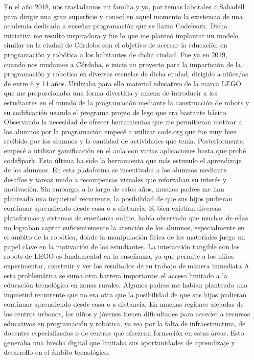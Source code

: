 
En el año 2018, nos trasladamos mi familia y yo, por temas laborales a Sabadell para dirigir una gran superficie y conocí en aquel momento la existencia de una academia dedicada a enseñar programación que se llama Codelearn. Dicha iniciativa me resulto inspiradora y fue lo que me planteó implantar un modelo similar en la ciudad de Córdoba con el objetivo de acercar la educación en programación y robótica a los habitantes de dicha ciudad.
Fue ya en 2019, cuando nos mudamos a Córdoba, e inicie un proyecto para la impartición de la programación y robotica en diversas escuelas de dicha ciudad, dirigido a niños/as de entre 6 y 14 años. Utilizaba para ello material educativo de la marca LEGO que me proporcionaba una forma divertida y amena de introducir a los estudiantes en el mundo de la programación mediante la construcción de robots y su codificación usando el programa propio de lego que era bastante básico.
Observando la necesidad de ofrecer herramientas que me permitieran motivar a los alumnos por la programación empecé a utilizar code.org que fue muy bien recibido por los alumnos y la cantidad de actividades que tenía. Posteriormente, empecé a utilizar gamificación en el aula con varias aplicaciones hasta que probé codeSpark. Esta última ha sido la herramienta que más estimulo el aprendizaje de los alumnos. En esta plataforma se incentivaba a los alumnos mediante desafíos y tareas unido a recompensas visuales que reforzaban su interés y motivación.
Sin embargo, a lo largo de estos años, muchos padres me han planteado una inquietud recurrente, la posibilidad de que sus hijos pudieran continuar aprendiendo desde casa o a distancia. Si bien existían diversas plataformas y sistemas de enseñanza online, había observado que muchas de ellas no lograban captar suficientemente la atención de los alumnos, especialmente en el ámbito de la robótica, donde la manipulación física de los materiales juega un papel clave en la motivación de los estudiantes. La interacción tangible con los robots de LEGO es fundamental en la enseñanza, ya que permite a los niños experimentar, construir y ver los resultados de su trabajo de manera inmediata
A esta problemática se suma otra barrera importante: el acceso limitado a la educación tecnológica en zonas rurales. Algunos padres me habían planteado una inquietud recurrente que no era otra que la posibilidad de que sus hijos pudieran continuar aprendiendo desde casa o a distancia. En muchas regiones alejadas de los centros urbanos, los niños y jóvenes tienen dificultades para acceder a recursos educativos en programación y robótica, ya sea por la falta de infraestructura, de docentes especializados o de centros que ofrezcan formación en estas áreas. Esto generaba una brecha digital que limitaba sus oportunidades de aprendizaje y desarrollo en el ámbito tecnológico.
